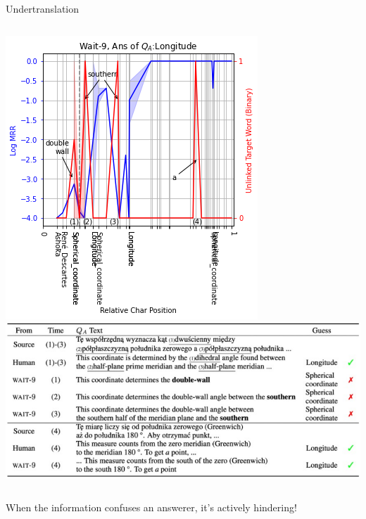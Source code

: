 \documentclass[compress]{beamer}
\begin{document}
\begin{frame}{Undertranslation}
  \begin{columns}
    \includegraphics[width=0.5\paperwidth]{simtrans/simQA/ex_hallucination}
\includegraphics[width=0.5\paperwidth]{simtrans/simQA/ex_hallucination_text}

  \end{columns}
  
When the information confuses an
  answerer, it's actively hindering!
\end{frame}
\end{document}
